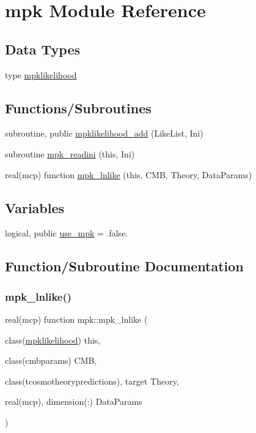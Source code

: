 \hypertarget{namespacempk}{}\section{mpk Module Reference}
\label{namespacempk}
\subsection*{Data Types}
\begin{DoxyCompactItemize}
\item 
type \mbox{\hyperlink{structmpk_1_1mpklikelihood}{mpklikelihood}}
\end{DoxyCompactItemize}
\subsection*{Functions/\+Subroutines}
\begin{DoxyCompactItemize}
\item 
subroutine, public \mbox{\hyperlink{namespacempk_ae7cb8b283f9de4deefe99581fac85c0a}{mpklikelihood\+\_\+add}} (Like\+List, Ini)
\item 
subroutine \mbox{\hyperlink{namespacempk_ac8174e4d3727a0be4651a6e3c23a413b}{mpk\+\_\+readini}} (this, Ini)
\item 
real(mcp) function \mbox{\hyperlink{namespacempk_a881489521c6dfae2df332a70f188e9db}{mpk\+\_\+lnlike}} (this, C\+MB, Theory, Data\+Params)
\end{DoxyCompactItemize}
\subsection*{Variables}
\begin{DoxyCompactItemize}
\item 
logical, public \mbox{\hyperlink{namespacempk_adf47eff3dde9016dbf1a2749db2ec13f}{use\+\_\+mpk}} = .false.
\end{DoxyCompactItemize}


\subsection{Function/\+Subroutine Documentation}
\mbox{\label{namespacempk_a881489521c6dfae2df332a70f188e9db}} 
\subsubsection{\texorpdfstring{mpk\+\_\+lnlike()}{mpk\_lnlike()}}
{\footnotesize\ttfamily real(mcp) function mpk\+::mpk\+\_\+lnlike (\begin{DoxyParamCaption}\item[{class(\mbox{\hyperlink{structmpk_1_1mpklikelihood}{mpklikelihood}})}]{this,  }\item[{class(cmbparams)}]{C\+MB,  }\item[{class(tcosmotheorypredictions), target}]{Theory,  }\item[{real(mcp), dimension(\+:)}]{Data\+Params }\end{DoxyParamCaption})}



